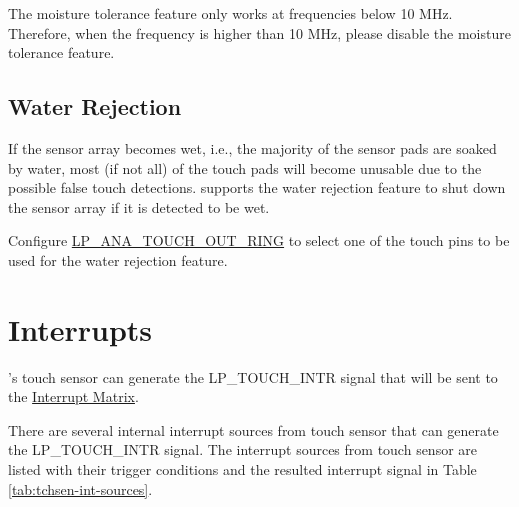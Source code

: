 \documentclass[main\_\_EN.tex]{subfiles}
\begin{document}
\begin{tiplisting}
The moisture tolerance feature only works at frequencies below 10 MHz. Therefore, when the frequency is higher than 10 MHz, please disable the moisture tolerance feature.
\end{tiplisting}

\subsection{Water Rejection}
\label{sec:tchsen-water-reject}

If the sensor array becomes wet, i.e., the majority of the sensor pads are soaked by water, most (if not all) of the touch pads will become unusable due to the possible false touch detections. \chipname{} supports the water rejection feature to shut down the sensor array if it is detected to be wet.

Configure \hyperref[fielddesc:LPANATOUCHOUTRING]{LP\_ANA\_TOUCH\_OUT\_RING} to select one of the touch pins to be used for the water rejection feature.



\section{Interrupts}

\chipname{}'s touch sensor can generate the LP\_TOUCH\_INTR signal that will be sent to the \hyperref[mod:intmtrx]{Interrupt Matrix}.

There are several internal interrupt sources from touch sensor that can generate the LP\_TOUCH\_INTR signal. The interrupt sources from touch sensor are listed with their trigger conditions and the resulted interrupt signal in Table \ref{tab:tchsen-int-sources}.
\end{document}
